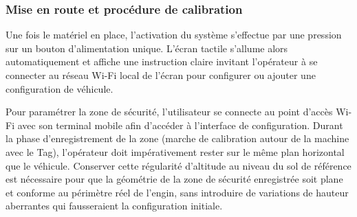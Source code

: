 \subsubsection{Mise en route et procédure de calibration}

Une fois le matériel en place, l'activation du système s'effectue par une pression sur un bouton d'alimentation unique. L'écran tactile s'allume alors automatiquement et affiche une instruction claire invitant l'opérateur à se connecter au réseau Wi-Fi local de l'écran pour configurer ou ajouter une configuration de véhicule.

Pour paramétrer la zone de sécurité, l'utilisateur se connecte au point d'accès Wi-Fi avec son terminal mobile afin d'accéder à l'interface de configuration. Durant la phase d'enregistrement de la zone (marche de calibration autour de la machine avec le Tag), l'opérateur doit impérativement rester sur le même plan horizontal que le véhicule. Conserver cette régularité d'altitude au niveau du sol de référence est nécessaire pour que la géométrie de la zone de sécurité enregistrée soit plane et conforme au périmètre réel de l'engin, sans introduire de variations de hauteur aberrantes qui fausseraient la configuration initiale.